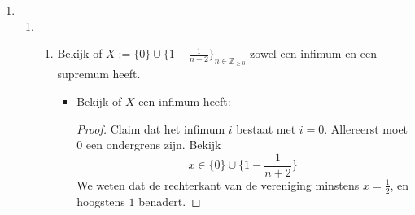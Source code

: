 \documentclass{article}
\newcommand{\f}[2]{\frac{#1}{#2}}
\newcommand{\ol}[1]{\overline{#1}}
\newcommand{\Z}{\mathbb{Z}}
\newcommand{\Q}{\mathbb{Q}}
\newcommand{\q}[1]{#1/_\sim}
\begin{document}
\begin{enumerate}[label=\arabic*]
\begin{enumerate}[label=\alph*)]
                    Als we nu gaan kijken naar \(\Q/_\sim\),
                    dan kunnen we elke equivalentie-klasse
                    \(\ol{q}\) kunnen schrijven als:
                    \[\ol{q} = \ol{\f{1}{k}} = \{(\f{k(i) + 1}{k}) : i \in \Z\}\]
                    Hieruit volgt dus dat we oneindig equivalentie-klassen hebben want
                    we kunnen een bijectie opstellen vanuit \(f:\Z \rightarrow (0, 1]\) met \(f(k) = \f{1}{k}\), en dus
                    zijn het aantal equivalentie-klassen aftelbaar oneindig.
                    Daarnaast heeft elke equivalentie-klasse oneindig elementen omdat:
                    \[\f{k(i) + 1}{k} = i + \f{1}{k}\]
                    We kunnen dit zien als een strikt stijgende lijn,
                    en dus moet elke equivalentie-klasse oneindig aantal elementen bevatten.
              \item
                    Ik denk niet dat dit kan. Ik stel voor dat het wel kan, en probeer een tegenspraak te herleiden.
                    \begin{proof}
                        Stel dat er een Quotiëntruimte bestaat waarbij $|\q{Q}| = n$, en $|\ol{q}| = m$, waarbij $\ol{q} \in \q{Q}$,
                        We weten dat $(\q{Q})$ partities vormen in \(\Q\).
                        Dit betekent dus dat $\Q$ partities $\ol{q}$ moet vormen waarbij
                        elk element van $\Q$ opgedeeld wordt, echter
                        geldt voor $|\ol{q}| = m$ en $|\q{Q}| = n$, en dus zijn
                        er hoogstens $n\cdot m$ aantal elementen. Dit luidt tot een
                        tegenspraak want $n \cdot m < \infty = |\Q|$.
                    \end{proof}
          \end{enumerate}
    \item
          \begin{enumerate}[label=\alph*)]
              \item \begin{enumerate}
                        \item Bekijk of $X:= \{0\} \cup \{1 - \f{1}{n+2}\}_{n \in \Z_{\geq 0}}$ zowel een infimum en een supremum heeft.
                              \begin{itemize}
                                  \item Bekijk of $X$ een infimum heeft:
                                        \begin{proof}
                                            Claim dat het infimum $i$ bestaat met $i = 0$.
                                            Allereerst moet $0$ een ondergrens zijn.
                                            Bekijk \[x \in \{0\} \cup \{1 - \f{1}{n+2}\}\]
                                            We weten dat de rechterkant van de vereniging minstens
                                            $x = \f{1}{2}$, en hoogstens $1$ benadert.


\end{proof}
\end{itemize}
\end{enumerate}
\end{enumerate}
\end{enumerate}
\end{document}
